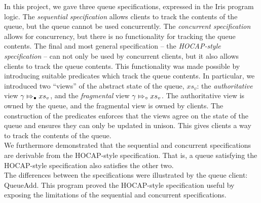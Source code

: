 \documentclass[a4paper, 10pt]{report}
\theoremstyle{definition}
\newcommand{\absvalueList}{xs_v}
\newcommand{\abstractstatefullfrag}[2]{#1 \Mapsto_{\circ} #2}
\newcommand{\abstractstateauth}[2]{#1 \Mapsto_{\bullet} #2}
\begin{document}
In this project, we gave three queue specifications, expressed in the Iris program logic. The \textit{sequential specification} allows clients to track the contents of the queue, but the queue cannot be used concurrently. The \textit{concurrent specification} allows for concurrency, but there is no functionality for tracking the queue contents. The final and most general specification -- the \textit{HOCAP-style specification} -- can not only be used by concurrent clients, but it also allows clients to track the queue contents. This functionality was made possible by introducing suitable predicates which track the queue contents. In particular, we introduced two ``views'' of the abstract state of the queue, $\absvalueList$: the \textit{authoritative} view $\abstractstateauth{\gname}{\absvalueList}$, and the \textit{fragmental} view $\abstractstatefullfrag{\gname}{\absvalueList}$. The authoritative view is owned by the queue, and the fragmental view is owned by clients. The construction of the predicates enforces that the views agree on the state of the queue and ensures they can only be updated in unison. This gives clients a way to track the contents of the queue.\\
We furthermore demonstrated that the sequential and concurrent specifications are derivable from the HOCAP-style specification. That is, a queue satisfying the HOCAP-style specification also satisfies the other two.\\
The differences between the specifications were illustrated by the queue client: QueueAdd. This program proved the HOCAP-style specification useful by exposing the limitations of the sequential and concurrent specifications.
\end{document}
